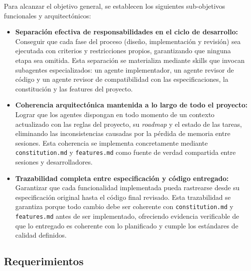 \documentclass[11pt, letterpaper]{article}
\begin{document}
Para alcanzar el objetivo general, se establecen los siguientes sub-objetivos funcionales y arquitectónicos:
\begin{itemize}
    \item \textbf{Separación efectiva de responsabilidades en el ciclo de desarrollo:} Conseguir que cada fase del proceso (diseño, implementación y revisión) sea ejecutada con criterios y restricciones propios, garantizando que ninguna etapa sea omitida. Esta separación se materializa mediante skills que invocan subagentes especializados: un agente implementador, un agente revisor de código y un agente revisor de compatibilidad con las especificaciones, la constitución y las features del proyecto.

    \item \textbf{Coherencia arquitectónica mantenida a lo largo de todo el proyecto:} Lograr que los agentes dispongan en todo momento de un contexto actualizado con las reglas del proyecto, su \textit{roadmap} y el estado de las tareas, eliminando las inconsistencias causadas por la pérdida de memoria entre sesiones. Esta coherencia se implementa concretamente mediante \texttt{constitution.md} y \texttt{features.md} como fuente de verdad compartida entre sesiones y desarrolladores.

    \item \textbf{Trazabilidad completa entre especificación y código entregado:} Garantizar que cada funcionalidad implementada pueda rastrearse desde su especificación original hasta el código final revisado. Esta trazabilidad se garantiza porque todo cambio debe ser coherente con \texttt{constitution.md} y \texttt{features.md} antes de ser implementado, ofreciendo evidencia verificable de que lo entregado es coherente con lo planificado y cumple los estándares de calidad definidos.
\end{itemize}

\subsection{Requerimientos}
\label{sec:requerimientos}
\end{document}
